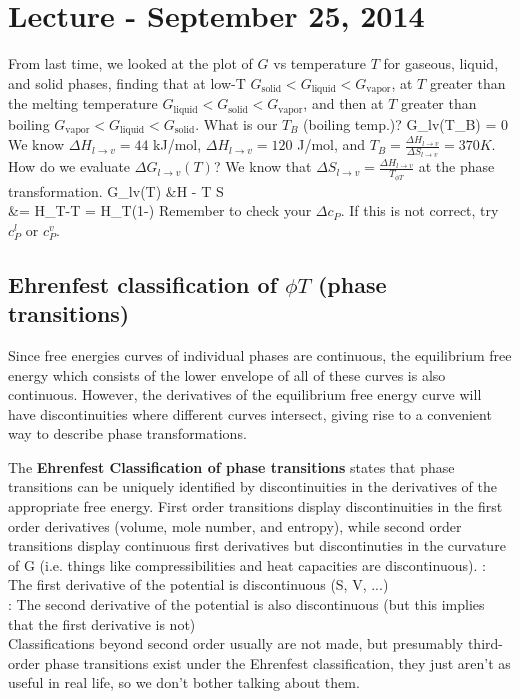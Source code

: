 \documentclass[12pt]{article}
\begin{document}
\section{Lecture - September 25, 2014}
From last time, we looked at the plot of $G$ vs temperature $T$ for gaseous, liquid, and solid phases, finding that at low-T $G_\text{solid} < G_\text{liquid} <  G_\text{vapor}$, at $T$ greater than the melting temperature $G_\text{liquid} < G_\text{solid} <  G_\text{vapor}$, and then at $T$ greater than boiling $G_\text{vapor} < G_\text{liquid} <  G_\text{solid}$.  What is our $T_B$ (boiling temp.)?
\eqs
\Delta G_{l\rightarrow v}(T_B) = 0
\eqe
We know $\Delta H_{l\rightarrow v} = 44$ kJ/mol, $\Delta H_{l\rightarrow v} = 120$ J/mol, and $T_B = \frac{\Delta H_{l\rightarrow v}}{\Delta S_{l\rightarrow v}} = 370 K$.  How do we evaluate $\Delta G_{l\rightarrow v}(T)$?  We know that $\Delta S_{l\rightarrow v} = \frac{\Delta H_{l\rightarrow v}}{T_{\phi T}}$ at the phase transformation.
\eqs
\Delta G_{l\rightarrow v}(T) &\approx \Delta H - T \Delta S\\
&= \Delta H_{\phi T}-T = \Delta H_{\phi T}(1-)
\eqe
Remember to check your $\Delta c_P$.  If this is not correct, try $c_P^{l}$ or $c_P^{v}$.\\

\subsection{Ehrenfest classification of $\phi T$ (phase transitions)}
Since free energies curves of individual phases are continuous, the equilibrium free energy which consists of the lower envelope of all of these curves is also continuous. However, the derivatives of the equilibrium free energy curve will have discontinuities where different curves intersect, giving rise to a convenient way to describe phase transformations. 

The \textbf{Ehrenfest Classification of phase transitions} states that phase transitions can be uniquely identified by discontinuities in the derivatives of the appropriate free energy. First order transitions display discontinuities in the first order derivatives (volume, mole number, and entropy), while second order transitions display continuous first derivatives but discontinuties in the curvature of G (i.e. things like compressibilities and heat capacities are discontinuous).
:  The first derivative of the potential is discontinuous (S, V, ...)\\
:  The second derivative of the potential is also discontinuous (but this implies that the first derivative is not)\\
Classifications beyond second order usually are not made, but presumably third-order phase transitions exist under the Ehrenfest classification, they just aren't as useful in real life, so we don't bother talking about them.
\end{document}
